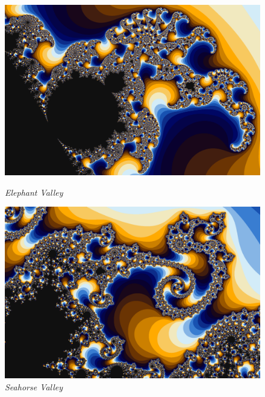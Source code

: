 \documentclass[final,12pt,a4paper]{elsarticle}
\begin{document}
\begin{figure}[]
    \captionsetup{width=.4\linewidth}
    \centering
    \begin{minipage}{.48\textwidth}
    \centering
        \includegraphics[width=.85\textwidth]{elephant}
    \caption{\textit{Elephant Valley}}
    \label{fig:regions}
    \end{minipage}%
    \begin{minipage}{.48\textwidth}
    \centering
        \includegraphics[width=.85\textwidth]{seahorse}
    \caption{\textit{Seahorse Valley}}
    \label{fig:regions}
    \end{minipage}


\end{figure}
\end{document}
